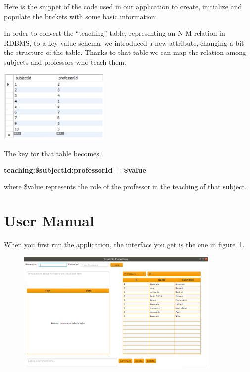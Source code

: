 \documentclass[a4paper, oneside]{article}
\begin{document}
Here is the snippet of the code used in our application to create, initialize and populate the buckets with some basic information:
\vspace{3mm}

\vspace{5mm}
In order to convert the “teaching” table, representing an N-M relation in RDBMS, to a key-value schema, we introduced a new attribute, changing a bit the structure of the table. Thanks to that table we can map the relation among subjects and professors who teach them.\\
\begin{minipage}{\linewidth}
\begin{center}
\vspace{4mm}
\includegraphics[width = 0.4\textwidth]{./images/table/teaching} 
\vspace{2mm}
\label{fig:teachingTable}
\end{center}
\vspace{3mm}
\end{minipage}
The key for that table becomes:
\begin{center}
\textbf{teaching:\$subjectId:professorId = \$value}
\end{center}
where \$value represents the role of the professor in the teaching of that subject.



\clearpage
\section{User Manual}
When you first run the application, the interface you get is the one in figure~\ref{fig:screen0}. 

\begin{figure}[h]
\centering
\includegraphics[width=0.88\textwidth]{images/screens/screen0}
\label{fig:screen0}
\end{figure}
\end{document}
